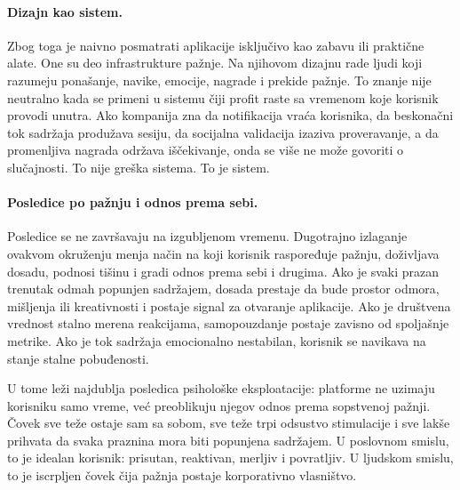 \paragraph{Dizajn kao sistem.}
Zbog toga je naivno posmatrati aplikacije isključivo kao zabavu ili praktične alate. One su deo infrastrukture pažnje. Na njihovom dizajnu rade ljudi koji razumeju ponašanje, navike, emocije, nagrade i prekide pažnje. To znanje nije neutralno kada se primeni u sistemu čiji profit raste sa vremenom koje korisnik provodi unutra. Ako kompanija zna da notifikacija vraća korisnika, da beskonačni tok sadržaja produžava sesiju, da socijalna validacija izaziva proveravanje, a da promenljiva nagrada održava iščekivanje, onda se više ne može govoriti o slučajnosti. To nije greška sistema. To je sistem.

\paragraph{Posledice po pažnju i odnos prema sebi.}
Posledice se ne završavaju na izgubljenom vremenu. Dugotrajno izlaganje ovakvom okruženju menja način na koji korisnik raspoređuje pažnju, doživljava dosadu, podnosi tišinu i gradi odnos prema sebi i drugima. Ako je svaki prazan trenutak odmah popunjen sadržajem, dosada prestaje da bude prostor odmora, mišljenja ili kreativnosti i postaje signal za otvaranje aplikacije. Ako je društvena vrednost stalno merena reakcijama, samopouzdanje postaje zavisno od spoljašnje metrike. Ako je tok sadržaja emocionalno nestabilan, korisnik se navikava na stanje stalne pobuđenosti.

U tome leži najdublja posledica psihološke eksploatacije: platforme ne uzimaju korisniku samo vreme, već preoblikuju njegov odnos prema sopstvenoj pažnji. Čovek sve teže ostaje sam sa sobom, sve teže trpi odsustvo stimulacije i sve lakše prihvata da svaka praznina mora biti popunjena sadržajem. U poslovnom smislu, to je idealan korisnik: prisutan, reaktivan, merljiv i povratljiv. U ljudskom smislu, to je iscrpljen čovek čija pažnja postaje korporativno vlasništvo.